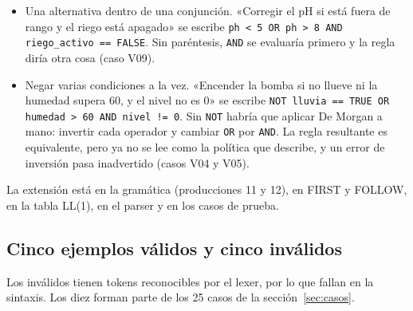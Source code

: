 \documentclass[11pt,a4paper]{article}
\newcommand{\tk}[1]{\texttt{#1}}
\begin{document}
\begin{itemize}
  \item Una alternativa dentro de una conjunción. «Corregir el pH si
    está fuera de rango y el riego está apagado» se escribe
    \texttt{ph < 5 OR ph > 8 AND riego\_activo == FALSE}. Sin
    paréntesis, \tk{AND} se evaluaría primero y la regla diría otra
    cosa (caso V09).
  \item Negar varias condiciones a la vez. «Encender la bomba si no
    llueve ni la humedad supera 60, y el nivel no es 0» se escribe
    \texttt{NOT lluvia == TRUE OR humedad > 60 AND
    nivel != 0}. Sin
    \tk{NOT} habría que aplicar De Morgan a mano: invertir cada
    operador y cambiar \tk{OR} por \tk{AND}. La regla resultante es
    equivalente, pero ya no se lee como la política que describe, y
    un error de inversión pasa inadvertido (casos V04 y V05).
\end{itemize}

La extensión está en la gramática (producciones 11 y 12), en FIRST y
FOLLOW, en la tabla LL(1), en el parser y en los casos de prueba.

\subsection{Cinco ejemplos válidos y cinco inválidos}

Los inválidos tienen tokens reconocibles por el lexer, por lo que
fallan en la sintaxis. Los diez forman parte de los 25 casos de la
sección~\ref{sec:casos}.
\end{document}
